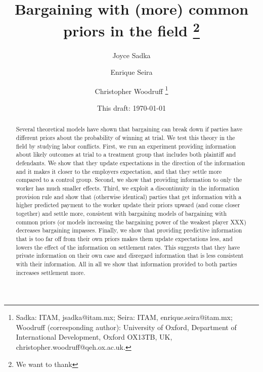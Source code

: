 \documentclass[oneside,11pt]{article}
\begin{document}
\title{Bargaining with (more) common priors in the field \thanks{We want to thank}}
\author{Joyce Sadka \and Enrique Seira  \and Christopher Woodruff \thanks{\protect\linespread{1}\protect\selectfont Sadka: ITAM, jsadka@itam.mx;  
Seira: ITAM, enrique.seira@itam.mx; Woodruff (corresponding author): University of Oxford, Department of International Development, Oxford OX13TB, UK, christopher.woodruff@qeh.ox.ac.uk.} }
\date{This draft:  \today \\[2 cm]}



\maketitle
\thispagestyle{empty}
\begin{abstract}

Several theoretical models have shown that bargaining can break down if parties have different priors about the probability of winning at trial. We test this theory in the field by studying labor conflicts. First, we run an experiment providing information about likely outcomes at trial to a treatment group that includes both plaintiff and defendants.  We show that they update expectations in the direction of the information and it makes it closer to the employers expectation, and that they settle more compared to a control group. Second, we show that providing information to only the worker has much smaller effects. Third, we exploit a discontinuity in the information provision rule and show that (otherwise identical) parties that get information with a higher predicted payment to the worker update their priors upward (and come closer together) and settle more, consistent with bargaining models of bargaining with common priors (or models increasing the bargaining power of the weakest player XXX) decreases bargaining impasses. Finally, we show that providing predictive information that is too far off from their own priors makes them update expectations less, and lowers the effect of the information on settlement rates. This suggests that they have private information on their own case and disregard information that is less consistent with their information. All in all we show that information provided to both parties increases settlement more.


\end{abstract}

\vspace{.3in}
\end{document}
